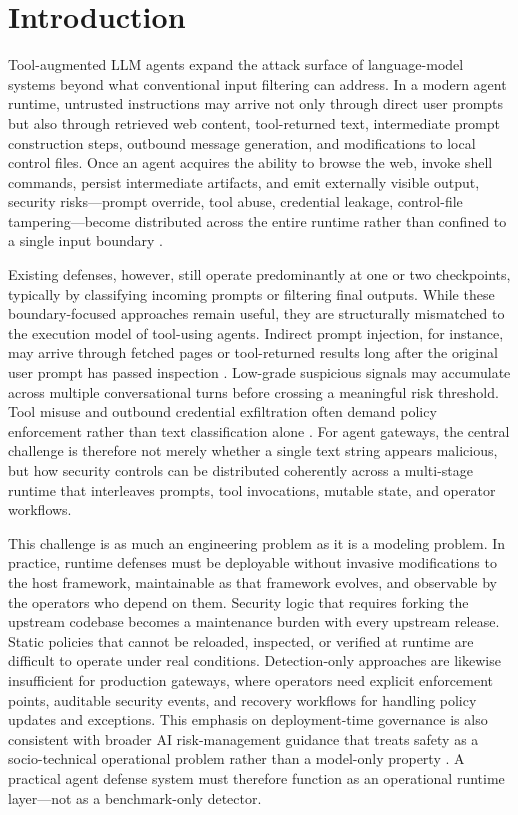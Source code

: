 \section{Introduction}

Tool-augmented LLM agents expand the attack surface of language-model systems beyond what conventional input filtering can address. In a modern agent runtime, untrusted instructions may arrive not only through direct user prompts but also through retrieved web content, tool-returned text, intermediate prompt construction steps, outbound message generation, and modifications to local control files. Once an agent acquires the ability to browse the web, invoke shell commands, persist intermediate artifacts, and emit externally visible output, security risks---prompt override, tool abuse, credential leakage, control-file tampering---become distributed across the entire runtime rather than confined to a single input boundary \cite{securityofaiagents2024,asb2024,owaspllmtop102025,mitreatlas2023}.

Existing defenses, however, still operate predominantly at one or two checkpoints, typically by classifying incoming prompts or filtering final outputs. While these boundary-focused approaches remain useful, they are structurally mismatched to the execution model of tool-using agents. Indirect prompt injection, for instance, may arrive through fetched pages or tool-returned results long after the original user prompt has passed inspection \cite{greshake2023,llamafirewall2025,indirectpromptfirewalls2025}. Low-grade suspicious signals may accumulate across multiple conversational turns before crossing a meaningful risk threshold. Tool misuse and outbound credential exfiltration often demand policy enforcement rather than text classification alone \cite{safe-tool-use2026}. For agent gateways, the central challenge is therefore not merely whether a single text string appears malicious, but how security controls can be distributed coherently across a multi-stage runtime that interleaves prompts, tool invocations, mutable state, and operator workflows.

This challenge is as much an engineering problem as it is a modeling problem. In practice, runtime defenses must be deployable without invasive modifications to the host framework, maintainable as that framework evolves, and observable by the operators who depend on them. Security logic that requires forking the upstream codebase becomes a maintenance burden with every upstream release. Static policies that cannot be reloaded, inspected, or verified at runtime are difficult to operate under real conditions. Detection-only approaches are likewise insufficient for production gateways, where operators need explicit enforcement points, auditable security events, and recovery workflows for handling policy updates and exceptions. This emphasis on deployment-time governance is also consistent with broader AI risk-management guidance that treats safety as a socio-technical operational problem rather than a model-only property \cite{nistairmf2023}. A practical agent defense system must therefore function as an operational runtime layer---not as a benchmark-only detector.

